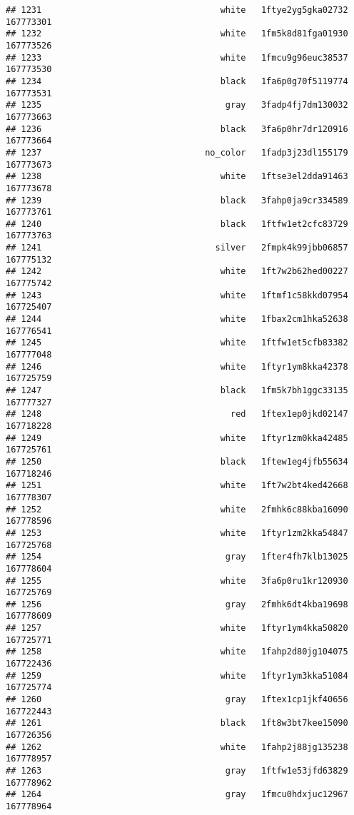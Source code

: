 \documentclass[
]{article}
\begin{document}
\begin{verbatim}
## 1231                                   white   1ftye2yg5gka02732 167773301
## 1232                                   white   1fm5k8d81fga01930 167773526
## 1233                                   white   1fmcu9g96euc38537 167773530
## 1234                                   black   1fa6p0g70f5119774 167773531
## 1235                                    gray   3fadp4fj7dm130032 167773663
## 1236                                   black   3fa6p0hr7dr120916 167773664
## 1237                                no_color   1fadp3j23dl155179 167773673
## 1238                                   white   1ftse3el2dda91463 167773678
## 1239                                   black   3fahp0ja9cr334589 167773761
## 1240                                   black   1ftfw1et2cfc83729 167773763
## 1241                                  silver   2fmpk4k99jbb06857 167775132
## 1242                                   white   1ft7w2b62hed00227 167775742
## 1243                                   white   1ftmf1c58kkd07954 167725407
## 1244                                   white   1fbax2cm1hka52638 167776541
## 1245                                   white   1ftfw1et5cfb83382 167777048
## 1246                                   white   1ftyr1ym8kka42378 167725759
## 1247                                   black   1fm5k7bh1ggc33135 167777327
## 1248                                     red   1ftex1ep0jkd02147 167718228
## 1249                                   white   1ftyr1zm0kka42485 167725761
## 1250                                   black   1ftew1eg4jfb55634 167718246
## 1251                                   white   1ft7w2bt4ked42668 167778307
## 1252                                   white   2fmhk6c88kba16090 167778596
## 1253                                   white   1ftyr1zm2kka54847 167725768
## 1254                                    gray   1fter4fh7klb13025 167778604
## 1255                                   white   3fa6p0ru1kr120930 167725769
## 1256                                    gray   2fmhk6dt4kba19698 167778609
## 1257                                   white   1ftyr1ym4kka50820 167725771
## 1258                                   white   1fahp2d80jg104075 167722436
## 1259                                   white   1ftyr1ym3kka51084 167725774
## 1260                                    gray   1ftex1cp1jkf40656 167722443
## 1261                                   black   1ft8w3bt7kee15090 167726356
## 1262                                   white   1fahp2j88jg135238 167778957
## 1263                                    gray   1ftfw1e53jfd63829 167778962
## 1264                                    gray   1fmcu0hdxjuc12967 167778964

\end{verbatim}
\end{document}
